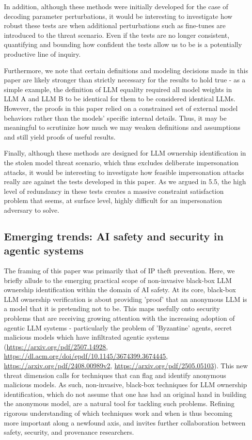 \documentclass{article}
\begin{document}
In addition, although these methods were initially developed for the case of decoding parameter perturbations, it would be interesting to investigate how robust these tests are when additional perturbations such as fine-tunes are introduced to the threat scenario. Even if the tests are no longer consistent, quantifying and bounding how confident the tests allow us to be is a potentially productive line of inquiry. 

Furthermore, we note that certain definitions and modeling decisions made in this paper are likely stronger than strictly necessary for the results to hold true - as a simple example, the definition of LLM equality required all model weights in LLM A and LLM B to be identical for them to be considered identical LLMs. However, the proofs in this paper relied on a constrained set of external model behaviors rather than the models' specific internal details. Thus, it may be meaningful to scrutinize how much we may weaken definitions and assumptions and still yield proofs of useful results.

Finally, although these methods are designed for LLM ownership identification in the stolen model threat scenario, which thus excludes deliberate impersonation attacks, it would be interesting to investigate how feasible impersonation attacks really are against the tests developed in this paper. As we argued in 5.5, the high level of redundancy in these tests creates a massive constraint satisfaction problem that seems, at surface level, highly difficult for an impersonation adversary to solve.

\subsection{Emerging trends: AI safety and security in agentic systems}
The framing of this paper was primarily that of IP theft prevention. Here, we briefly allude to the emerging practical scope of non-invasive black-box LLM ownership identification within the domain of AI safety. At its core, black-box LLM ownership verification is about providing 'proof' that an anonymous LLM is a model that it is pretending not to be. This maps usefully onto security problems that are receiving growing attention with the increasing adoption of agentic LLM systems - particularly the problem of 'Byzantine' agents, secret malicious models which have infiltrated agentic systems (\url{https://arxiv.org/pdf/2507.14928}, \url{https://dl.acm.org/doi/epdf/10.1145/3674399.3674445}, \url{https://arxiv.org/pdf/2408.00989v2}, \url{https://arxiv.org/pdf/2505.05103}). This new threat dimension calls for techniques that can flag and identify anonymous malicious models. As such, non-invasive, black-box techniques for LLM ownership identification, which do not assume that one has had an original hand in building the anonymous model, are a natural tool for tackling such problems. Refining rigorous understanding of which techniques work and when is thus becoming more important along a newfound axis, and invites further collaboration between safety, security, and provenance researchers.
\end{document}
